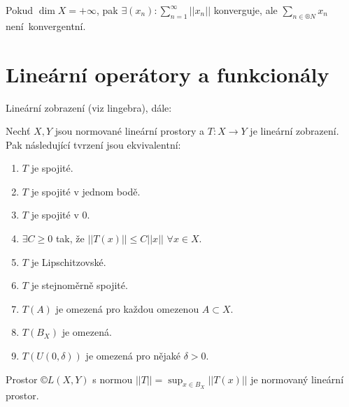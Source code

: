 \documentclass[12pt]{article}					%
\begin{document}
\begin{veta}
	Pokud $\dim X = +∞$, pak $\exists(x_n): \sum_{n=1}^∞ ||x_n||$ konverguje, ale $\sum_{n \in ®N}x_n$ není konvergentní.
\end{veta}

\section{Lineární operátory a funkcionály}
\begin{poznamka}
	Lineární zobrazení (viz lingebra), dále:
	
	\begin{veta}
		Nechť $X, Y$ jsou normované lineární prostory a $T: X \rightarrow Y$ je lineární zobrazení. Pak následující tvrzení jsou ekvivalentní:
		
		\begin{enumerate}
			\item $T$ je spojité.
			\item $T$ je spojité v jednom bodě.
			\item $T$ je spojité v 0.
			\item $\exists C ≥ 0$ tak, že $||T(x)|| ≤ C ||x||$ $\forall x \in X$.
			\item $T$ je Lipschitzovské.
			\item $T$ je stejnoměrně spojité.
			\item $T(A)$ je omezená pro každou omezenou $A \subset X$.
			\item $T(B_X)$ je omezená.
			\item $T(U(0, \delta))$ je omezená pro nějaké $\delta > 0$.
		\end{enumerate}
	\end{veta}

	Prostor $©L(X, Y)$ s normou $||T|| = \sup_{x \in B_X}||T(x)||$ je normovaný lineární prostor.
\end{poznamka}
\end{document}
